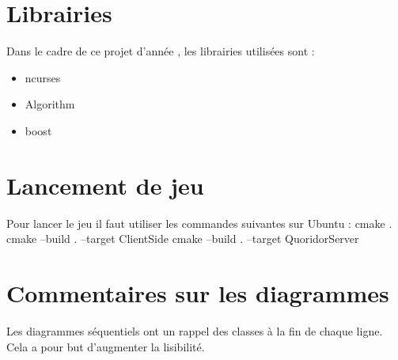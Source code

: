 \documentclass[french, utf8]{article}
\begin{document}
\section{Librairies}
Dans le cadre de ce projet d'année , les librairies utilisées sont :
\begin{itemize}
    \item ncurses
    \item Algorithm
    \item boost
\end{itemize}

\section{Lancement de jeu}
Pour lancer le jeu il faut utiliser les commandes suivantes sur Ubuntu :
cmake .
cmake --build . --target ClientSide
cmake --build . --target QuoridorServer



\section{Commentaires sur les diagrammes}
Les diagrammes séquentiels ont un rappel des classes à la fin de chaque ligne. Cela a pour but d'augmenter la lisibilité.
\end{document}
